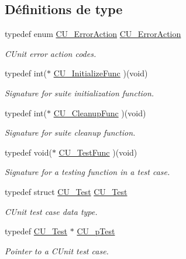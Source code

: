 \subsection*{Définitions de type}
\begin{DoxyCompactItemize}
\item 
typedef enum \hyperlink{group__Framework_ga50053b4edbfc96a88027dd57c580ca35}{C\-U\-\_\-\-Error\-Action} \hyperlink{group__Framework_gab68a2bd9fee7d73f79c0cfc68c576b3a}{C\-U\-\_\-\-Error\-Action}
\begin{DoxyCompactList}\small\item\em C\-Unit error action codes. \end{DoxyCompactList}\item 
typedef int($\ast$ \hyperlink{group__Framework_gaab4b8ad3aa3a3c222c43c8a330de11e3}{C\-U\-\_\-\-Initialize\-Func} )(void)
\begin{DoxyCompactList}\small\item\em Signature for suite initialization function. \end{DoxyCompactList}\item 
typedef int($\ast$ \hyperlink{group__Framework_ga90966c0bede742195897c3aeff4c342b}{C\-U\-\_\-\-Cleanup\-Func} )(void)
\begin{DoxyCompactList}\small\item\em Signature for suite cleanup function. \end{DoxyCompactList}\item 
typedef void($\ast$ \hyperlink{group__Framework_ga5868148b642b30635b8fe7f095c5b493}{C\-U\-\_\-\-Test\-Func} )(void)
\begin{DoxyCompactList}\small\item\em Signature for a testing function in a test case. \end{DoxyCompactList}\item 
typedef struct \hyperlink{structCU__Test}{C\-U\-\_\-\-Test} \hyperlink{group__Framework_ga0bc6468b9781a574e2c7994ca700ee1e}{C\-U\-\_\-\-Test}
\begin{DoxyCompactList}\small\item\em C\-Unit test case data type. \end{DoxyCompactList}\item 
typedef \hyperlink{structCU__Test}{C\-U\-\_\-\-Test} $\ast$ \hyperlink{group__Framework_ga249c43fbe4e53452b3f90db1437da04b}{C\-U\-\_\-p\-Test}
\begin{DoxyCompactList}\small\item\em Pointer to a C\-Unit test case. \end{DoxyCompactList}\item 

\end{DoxyCompactItemize}
